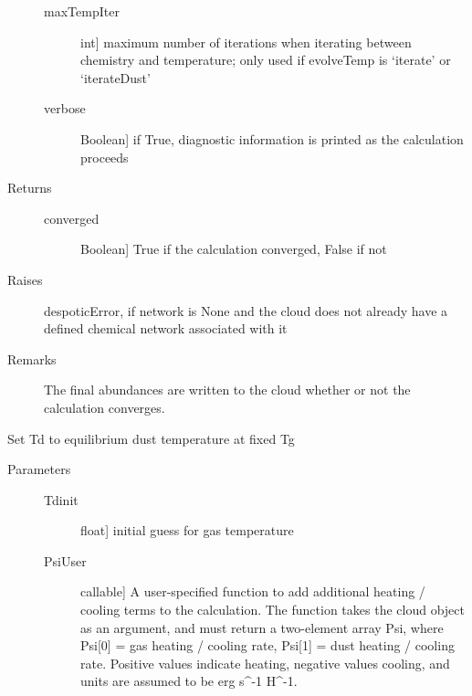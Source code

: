 \documentclass[letterpaper,10pt,english]{sphinxmanual}
\begin{document}
\begin{fulllineitems}
\begin{fulllineitems}
\begin{description}
\begin{description}
\item[{maxTempIter}] \leavevmode{[}int{]}
maximum number of iterations when iterating between chemistry
and temperature; only used if evolveTemp is `iterate' or
`iterateDust'

\item[{verbose}] \leavevmode{[}Boolean{]}
if True, diagnostic information is printed as the calculation
proceeds

\end{description}

\item[{Returns}] \leavevmode\begin{description}
\item[{converged}] \leavevmode{[}Boolean{]}
True if the calculation converged, False if not

\end{description}

\item[{Raises}] \leavevmode
despoticError, if network is None and the cloud does not
already have a defined chemical network associated with it

\item[{Remarks}] \leavevmode
The final abundances are written to the cloud whether or
not the calculation converges.

\end{description}

\end{fulllineitems}


\begin{fulllineitems}
\label{fulldoc:despotic.cloud.setDustTempEq}
Set Td to equilibrium dust temperature at fixed Tg
\begin{description}
\item[{Parameters}] \leavevmode\begin{description}
\item[{Tdinit}] \leavevmode{[}float{]}
initial guess for gas temperature

\item[{PsiUser}] \leavevmode{[}callable{]}
A user-specified function to add additional heating /
cooling terms to the calculation. The function takes the
cloud object as an argument, and must return a two-element
array Psi, where Psi{[}0{]} = gas heating / cooling rate,
Psi{[}1{]} = dust heating / cooling rate. Positive values
indicate heating, negative values cooling, and units are
assumed to be erg s\textasciicircum{}-1 H\textasciicircum{}-1.


\end{description}
\end{description}
\end{fulllineitems}
\end{fulllineitems}
\end{document}
